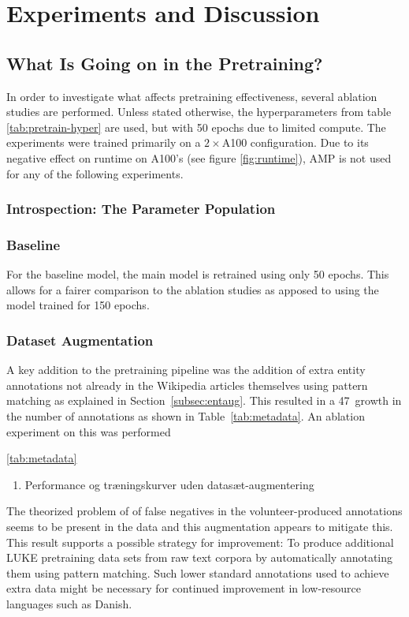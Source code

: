 \documentclass[main.tex]{subfiles}
\begin{document}
\chapter{Experiments and Discussion}

\section{What Is Going on in the Pretraining?}
\label{sec:pretrainpls}
In order to investigate what affects pretraining effectiveness, several ablation studies are performed.
Unless stated otherwise, the hyperparameters from table \ref{tab:pretrain-hyper} are used, but with 50 epochs due to limited compute.
The experiments were trained primarily on a $ 2\times$A100 configuration.
Due to its negative effect on runtime on A100's (see figure \ref{fig:runtime}), AMP is not used for any of the following experiments.

\subsection{Introspection: The Parameter Population}

\subsection{Baseline}
For the baseline model, the main model is retrained using only 50 epochs.
This allows for a fairer comparison to the ablation studies as apposed to using the model trained for 150 epochs.

\subsection{Dataset Augmentation}
A key addition to the pretraining pipeline was the addition of extra entity annotations not already in the Wikipedia articles themselves using pattern matching as explained in Section~\ref{subsec:entaug}.
This resulted in a 47\pro\ growth in the number of annotations as shown in Table~\ref{tab:metadata}.
An ablation experiment on this was performed

\ref{tab:metadata}
\begin{enumerate}
    \item Performance og træningskurver uden datasæt-augmentering
\end{enumerate}

The theorized problem of of false negatives in the volunteer-produced annotations seems to be present in the data and this augmentation appears to mitigate this.
This result supports a possible strategy for improvement:
To produce additional LUKE pretraining data sets from raw text corpora by automatically annotating them using pattern matching.
Such lower standard annotations used to achieve extra data might be necessary for continued improvement in low-resource languages such as Danish.
\end{document}

